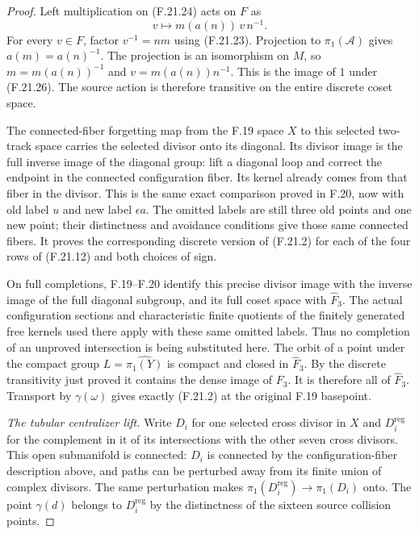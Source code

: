 \begin{proof}
Left multiplication on (F.21.24) acts on $F$ as
\[
                      v\longmapsto m(a(n))\,v\,n^{-1}.
                                                               \tag{F.21.26}
\]
For every $v\in F$, factor $v^{-1}=nm$ using
(F.21.23). Projection to $\pi_1(\mathscr A)$ gives
$a(m)=a(n)^{-1}$. The projection is an isomorphism
on $M$, so $m=m(a(n))^{-1}$ and
$v=m(a(n))n^{-1}$. This is the image of $1$ under
(F.21.26). The source action is therefore transitive
on the entire discrete coset space.

The connected-fiber forgetting map from the F.19 space
$X$ to this selected two-track space carries the
selected divisor onto its diagonal. Its divisor
image is the full inverse image of the diagonal
group: lift a diagonal loop and correct the endpoint
in the connected configuration fiber. Its kernel
already comes from that fiber in the divisor.
This is the same exact comparison proved in F.20,
now with old label $u$ and new label $\epsilon a$.
The omitted labels are still three old points and
one new point; their distinctness and avoidance
conditions give those same connected fibers.
It proves the corresponding discrete version of
(F.21.2) for each of the four rows of (F.21.12)
and both choices of sign.

On full completions, F.19--F.20 identify this precise
divisor image with the inverse image of the full
diagonal subgroup, and its full coset space with
$\widehat F_3$. The actual configuration sections
and characteristic finite quotients of the finitely
generated free kernels used there apply with these
same omitted labels. Thus no completion of an
unproved intersection is being substituted here.
The orbit of a point under the compact group
$L=\widehat{\pi_1(Y)}$ is compact and closed in
$\widehat F_3$. By the discrete transitivity just
proved it contains the dense image of $F_3$.
It is therefore all of $\widehat F_3$.
Transport by $\gamma(\omega)$ gives exactly
(F.21.2) at the original F.19 basepoint.

\emph{The tubular centralizer lift.}
Write $D_i$ for one selected cross divisor in $X$
and $D_i^{\mathrm{reg}}$ for the complement in it
of its intersections with the other seven cross
divisors. This open submanifold is connected:
$D_i$ is connected by the configuration-fiber
description above, and paths can be perturbed
away from its finite union of complex divisors.
The same perturbation makes
$\pi_1(D_i^{\mathrm{reg}})\to\pi_1(D_i)$ onto.
The point $\gamma(d)$ belongs to
$D_i^{\mathrm{reg}}$ by the distinctness of the
sixteen source collision points.


\end{proof}
